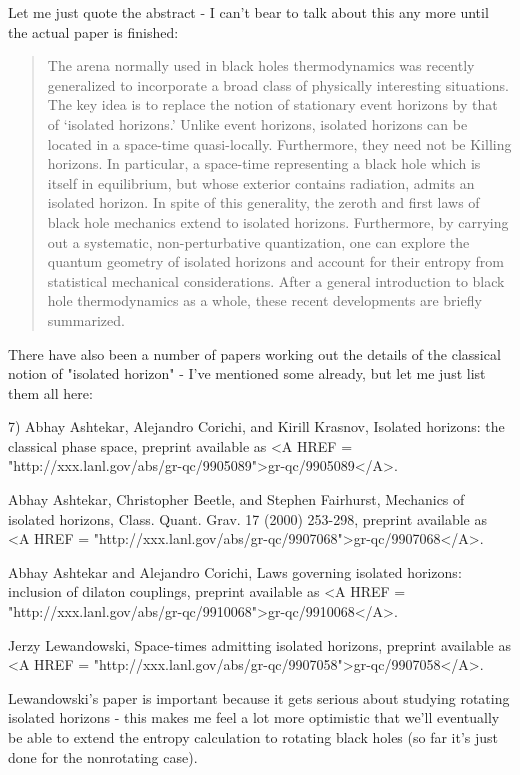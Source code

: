 Let me just quote the abstract - I can't bear to talk about this any
more until the actual paper is finished:

\begin{quote}
     The arena normally used in black holes thermodynamics was recently
     generalized to incorporate a broad class of physically interesting
     situations.  The key idea is to replace the notion of stationary
     event horizons by that of `isolated horizons.'  Unlike event
     horizons, isolated horizons can be located in a space-time
     quasi-locally. Furthermore, they need not be Killing horizons. In
     particular, a space-time representing a black hole which is itself
     in equilibrium, but whose exterior contains radiation, admits an
     isolated horizon.  In spite of this generality, the zeroth and
     first laws of black hole mechanics extend to isolated horizons.
     Furthermore, by carrying out a systematic, non-perturbative
     quantization, one can explore the quantum geometry of isolated
     horizons and account for their entropy from statistical mechanical
     considerations.  After a general introduction to black hole
     thermodynamics as a whole, these recent developments are briefly
     summarized.
\end{quote}
    
There have also been a number of papers working out the details
of the classical notion of "isolated horizon" - I've mentioned some 
already, but let me just list them all here:

7) Abhay Ashtekar, Alejandro Corichi, and Kirill Krasnov, 
Isolated horizons: the classical phase space, preprint available
as <A HREF = "http://xxx.lanl.gov/abs/gr-qc/9905089">gr-qc/9905089</A>.  

Abhay Ashtekar, Christopher Beetle, and Stephen Fairhurst, 
Mechanics of isolated horizons, Class. Quant. Grav. 17 (2000) 253-298,
preprint available as <A HREF = "http://xxx.lanl.gov/abs/gr-qc/9907068">gr-qc/9907068</A>.

Abhay Ashtekar and Alejandro Corichi, Laws governing isolated horizons:
inclusion of dilaton couplings, preprint available as <A HREF = "http://xxx.lanl.gov/abs/gr-qc/9910068">gr-qc/9910068</A>.

Jerzy Lewandowski, Space-times admitting isolated horizons, preprint
available as <A HREF = "http://xxx.lanl.gov/abs/gr-qc/9907058">gr-qc/9907058</A>. 

Lewandowski's paper is important because it gets serious about studying
rotating isolated horizons - this makes me feel a lot more optimistic
that we'll eventually be able to extend the entropy calculation to 
rotating black holes (so far it's just done for the nonrotating case).

